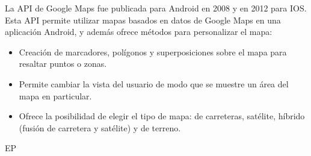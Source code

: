 La API de Google Maps \cite{URL::GoogleMapsApi} fue publicada para Android en 2008 y en 2012 para IOS. Esta API permite utilizar mapas basados en datos de Google Maps en una aplicación Android, y además ofrece métodos para personalizar el mapa:
\begin{itemize}
    \item Creación de marcadores, polígonos y superposiciones sobre el mapa para resaltar puntos o zonas. 
    \item Permite cambiar la vista del usuario de modo que se muestre un área del mapa en particular. 
    \item Ofrece la posibilidad de elegir el tipo de mapa: de carreteras, satélite, híbrido (fusión de carretera y satélite) y de terreno.
\end{itemize}

EP

